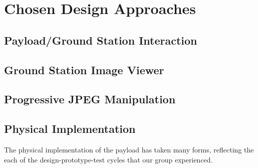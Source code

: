 \chapter{Chosen Design Approaches}




\section{Payload/Ground Station Interaction}

\section{Ground Station Image Viewer}

\section{Progressive JPEG Manipulation}

\section{Physical Implementation}

The physical implementation of the payload has taken many forms, reflecting 
the each of the design-prototype-test cycles that our group experienced.

